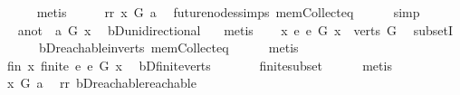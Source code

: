 \begin{isabellebody}
\ \ \ \ \isamarkupfalse%
\ metis\isanewline
\ \ \isamarkupfalse%
\ \isamarkupfalse%
\ rr{\isacharcolon}{\kern0pt}\ {\isachardoublequoteopen}x\ {\isasymrightarrow}\isactrlsup {\isacharplus}{\kern0pt}\isactrlbsub G\isactrlesub \ a{\isachardoublequoteclose}\ \isamarkupfalse%
\ future{\isacharunderscore}{\kern0pt}nodes{\isachardot}{\kern0pt}simps\ mem{\isacharunderscore}{\kern0pt}Collect{\isacharunderscore}{\kern0pt}eq\isanewline
\ \ \ \ \isamarkupfalse%
\ simp\ \ \isanewline
\ \ \isamarkupfalse%
\ \isamarkupfalse%
\ a{\isacharunderscore}{\kern0pt}not{\isacharcolon}{\kern0pt}\ {\isachardoublequoteopen}{\isasymnot}\ a\ {\isasymrightarrow}\isactrlsup {\isacharasterisk}{\kern0pt}\isactrlbsub G\isactrlesub \ x{\isachardoublequoteclose}\ \isamarkupfalse%
\ bD{\isachardot}{\kern0pt}unidirectional\ \ \isamarkupfalse%
\ metis\isanewline
\ \ \isamarkupfalse%
\ {\isachardoublequoteopen}{\isasymforall}x{\isachardot}{\kern0pt}\ {\isacharbraceleft}{\kern0pt}e{\isachardot}{\kern0pt}\ e\ {\isasymrightarrow}\isactrlsup {\isacharasterisk}{\kern0pt}\isactrlbsub G\isactrlesub \ x{\isacharbraceright}{\kern0pt}\ {\isasymsubseteq}\ verts\ G{\isachardoublequoteclose}\ \isamarkupfalse%
\ subsetI\isanewline
\ \ \ \ \ \ bD{\isachardot}{\kern0pt}reachable{\isacharunderscore}{\kern0pt}in{\isacharunderscore}{\kern0pt}verts{\isacharparenleft}{\kern0pt}{}{\isacharparenright}{\kern0pt}\ mem{\isacharunderscore}{\kern0pt}Collect{\isacharunderscore}{\kern0pt}eq\isanewline
\ \ \ \ \isamarkupfalse%
\ metis\ \isanewline
\ \ \isamarkupfalse%
\ \isamarkupfalse%
\ fin{\isacharcolon}{\kern0pt}\ {\isachardoublequoteopen}{\isasymforall}x{\isachardot}{\kern0pt}\ finite\ {\isacharbraceleft}{\kern0pt}e{\isachardot}{\kern0pt}\ e\ {\isasymrightarrow}\isactrlsup {\isacharasterisk}{\kern0pt}\isactrlbsub G\isactrlesub \ x{\isacharbraceright}{\kern0pt}{\isachardoublequoteclose}\ \isamarkupfalse%
\ bD{\isachardot}{\kern0pt}finite{\isacharunderscore}{\kern0pt}verts\ \isanewline
\ \ \ \ \ \ finite{\isacharunderscore}{\kern0pt}subset\isanewline
\ \ \ \ \isamarkupfalse%
\ metis\isanewline
\ \ \isamarkupfalse%
\ {\isachardoublequoteopen}x\ {\isasymrightarrow}\isactrlsup {\isacharasterisk}{\kern0pt}\isactrlbsub G\isactrlesub \ a{\isachardoublequoteclose}\ \isamarkupfalse%
\ rr\ bD{\isachardot}{\kern0pt}reachable{}{\isacharunderscore}{\kern0pt}reachable\ \isamarkupfalse%

\end{isabellebody}
